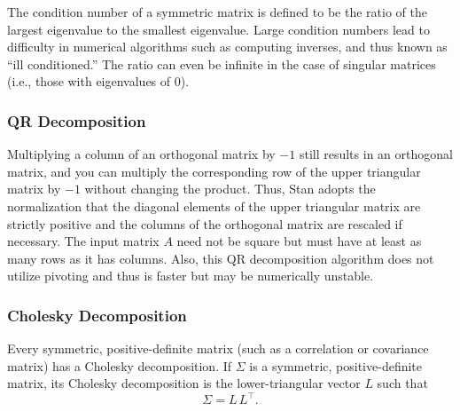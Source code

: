 The condition number of a symmetric matrix is defined to be the ratio
of the largest eigenvalue to the smallest eigenvalue.  Large condition
numbers lead to difficulty in numerical algorithms such as computing
inverses, and thus known as ``ill conditioned.''  The ratio can even
be infinite in the case of singular matrices (i.e., those with
eigenvalues of 0).

%
%
%

\subsubsection{QR Decomposition}

\begin{description}
%
%
%
\end{description}
%
Multiplying a column of an orthogonal matrix by $-1$ still results in 
an orthogonal matrix, and you can multiply the corresponding row of 
the upper triangular matrix by $-1$ without changing the product. Thus,
Stan adopts the normalization that the diagonal elements of the upper
triangular matrix are strictly positive and the columns of the 
orthogonal matrix are rescaled if necessary. The input matrix $A$ need
not be square but must have at least as many rows as it has columns.
Also, this QR decomposition algorithm does not utilize pivoting and 
thus is faster but may be numerically unstable.

\subsubsection{Cholesky Decomposition}

Every symmetric, positive-definite matrix (such as a correlation or
covariance matrix) has a Cholesky decomposition.  If $\Sigma$ is a
symmetric, positive-definite matrix, its Cholesky decomposition is the
lower-triangular vector $L$ such that
\[
\Sigma = L \, L^{\top}.
\]


